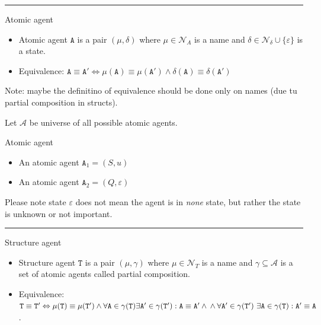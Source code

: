 \documentclass[12pt]{fithesis2}
\begin{document}
\noindent\rule{\textwidth}{1pt}

\begin{definition}{Atomic agent}

\begin{itemize}
\item Atomic agent $\mathtt{A}$ is a pair $(\mu, \delta)$ where $\mu \in \mathcal{N}_{A}$ is a name and $\delta \in \mathcal{N}_{\delta} \cup \{ \varepsilon \}$ is a state.

\item Equivalence: $\mathtt{A} \equiv \mathtt{A}' \Leftrightarrow \mu(\mathtt{A}) \equiv \mu(\mathtt{A}') \wedge \delta(\mathtt{A}) \equiv \delta(\mathtt{A}')$
\end{itemize}
\end{definition}

Note: maybe the definitino of equivalence should be done only on names (due tu partial composition in structs).

\begin{notation}
Let $\mathcal{A}$ be universe of all possible atomic agents.
\end{notation}

\begin{example}{Atomic agent}\label{example:atomic}

\begin{itemize}
\item An atomic agent $\mathtt{A}_1 = (S, u)$
\item An atomic agent $\mathtt{A}_2 = (Q, \varepsilon)$
\end{itemize}
\end{example}

Please note state $\varepsilon$ does not mean the agent is in \emph{none} state, but rather the state is unknown or not important.

\noindent\rule{\textwidth}{1pt}

\begin{definition}{Structure agent}

\begin{itemize}
\item Structure agent $\mathtt{T}$ is a pair $(\mu, \gamma)$ where $\mu \in \mathcal{N}_{T}$ is a name and $\gamma \subseteq \mathcal{A}$ is a set of atomic agents called partial composition.

\item Equivalence: $\mathtt{T} \equiv \mathtt{T}' \Leftrightarrow \mu(\mathtt{T}) \equiv \mu(\mathtt{T}') \wedge \forall \mathtt{A} \in \gamma(\mathtt{T}) \exists \mathtt{A}' \in \gamma(\mathtt{T}') : \mathtt{A} \equiv \mathtt{A}' \wedge \\ \wedge \forall \mathtt{A}' \in \gamma(\mathtt{T}') ~\exists \mathtt{A} \in \gamma(\mathtt{T}) : \mathtt{A}' \equiv \mathtt{A}$.
\end{itemize}
\end{definition}
\end{document}
